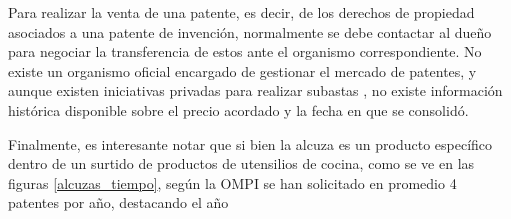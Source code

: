 Para realizar la venta de una patente, es decir, de los derechos de propiedad asociados a una patente de invención, normalmente se debe contactar al dueño para negociar la transferencia de estos ante el organismo correspondiente. No existe un organismo oficial encargado de gestionar el mercado de patentes, y aunque existen iniciativas privadas para realizar subastas , no existe información histórica disponible sobre el precio acordado y la fecha en que se consolidó.


Finalmente, es interesante notar que si bien la alcuza es un producto específico dentro de un surtido de productos de utensilios de cocina, como se ve en las figuras \ref{alcuzas_tiempo},
según la OMPI se han solicitado en promedio 4 patentes por año, destacando el año
